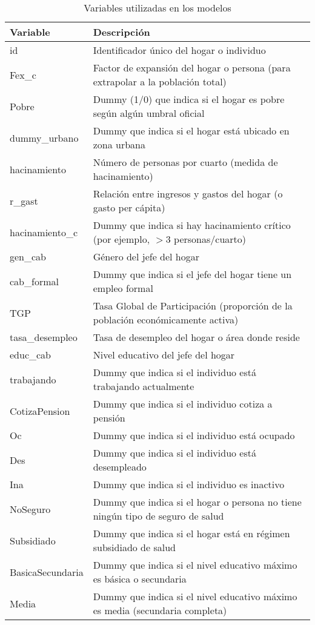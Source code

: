 \begin{table}[htbp]
\centering
\caption{Variables utilizadas en los modelos}
\label{tab:variables}
\begin{tabular}{p{4cm}p{9cm}}
\toprule
\textbf{Variable} & \textbf{Descripción} \\
\midrule
id & Identificador único del hogar o individuo \\
Fex\_c & Factor de expansión del hogar o persona (para extrapolar a la población total) \\
Pobre & Dummy (1/0) que indica si el hogar es pobre según algún umbral oficial \\
dummy\_urbano & Dummy que indica si el hogar está ubicado en zona urbana \\
hacinamiento & Número de personas por cuarto (medida de hacinamiento) \\
r\_gast & Relación entre ingresos y gastos del hogar (o gasto per cápita) \\
hacinamiento\_c & Dummy que indica si hay hacinamiento crítico (por ejemplo, $>$3 personas/cuarto) \\
gen\_cab & Género del jefe del hogar \\
cab\_formal & Dummy que indica si el jefe del hogar tiene un empleo formal \\
TGP & Tasa Global de Participación (proporción de la población económicamente activa) \\
tasa\_desempleo & Tasa de desempleo del hogar o área donde reside \\
educ\_cab & Nivel educativo del jefe del hogar \\
trabajando & Dummy que indica si el individuo está trabajando actualmente \\
CotizaPension & Dummy que indica si el individuo cotiza a pensión \\
Oc & Dummy que indica si el individuo está ocupado \\
Des & Dummy que indica si el individuo está desempleado \\
Ina & Dummy que indica si el individuo es inactivo \\
NoSeguro & Dummy que indica si el hogar o persona no tiene ningún tipo de seguro de salud \\
Subsidiado & Dummy que indica si el hogar está en régimen subsidiado de salud \\
BasicaSecundaria & Dummy que indica si el nivel educativo máximo es básica o secundaria \\
Media & Dummy que indica si el nivel educativo máximo es media (secundaria completa) \\

\end{tabular}
\end{table}
